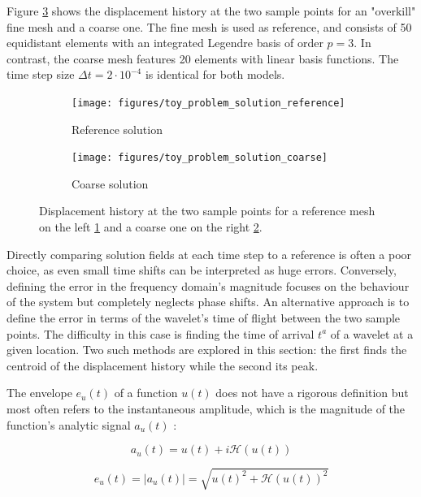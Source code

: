 Figure \ref{fig:toy_problem_solution} shows the displacement history at the two sample points for an "overkill" fine mesh and a coarse one. The fine mesh is used as reference, and consists of 50 equidistant elements with an integrated Legendre basis of order $p=3$. In contrast, the coarse mesh features 20 elements with linear basis functions. The time step size $\Delta t= 2 \cdot 10^{-4}$ is identical for both models.

\begin{figure}[h]
	\centering
	\begin{subfigure}{0.49\textwidth}
		\centering
		\texttt{[image: figures/toy\_problem\_solution\_reference]}
		\caption{Reference solution}
		\label{fig:toy_problem_solution_reference}
	\end{subfigure}
	\begin{subfigure}{0.49\textwidth}
		\texttt{[image: figures/toy\_problem\_solution\_coarse]}
		\caption{Coarse solution}
		\label{fig:toy_problem_solution_coarse}
	\end{subfigure}
	\caption{Displacement history at the two sample points for a reference mesh on the left \ref{fig:toy_problem_solution_reference} and a coarse one on the right \ref{fig:toy_problem_solution_coarse}.}
	\label{fig:toy_problem_solution}
\end{figure}

Directly comparing solution fields at each time step to a reference is often a
poor choice, as even small time shifts can be interpreted as huge errors. Conversely, defining the error in the frequency domain's magnitude focuses on the behaviour of the system but completely neglects phase shifts. An alternative approach is to define the error in terms of the wavelet's time of flight between the two sample points. The difficulty in this case is finding the time of arrival $t^a$ of a wavelet at a given location. Two such methods are explored in this section: the first finds the centroid of the displacement history while the second its peak.

The envelope $e_u(t)$ of a function $u(t)$ does not have a rigorous definition but most often refers to the instantaneous amplitude, which is the magnitude of the function's analytic signal $a_u(t)$ \cite{Huang1998}:

\begin{equation} \label{eq:analytic_signal}
	a_u(t) = u(t) + i \mathcal{H}(u(t))
\end{equation}

\begin{equation} \label{eq:envelope}
	e_u(t) = |a_u(t)| = \sqrt{ u(t)^2 + \mathcal{H}(u(t))^2 }
\end{equation}

